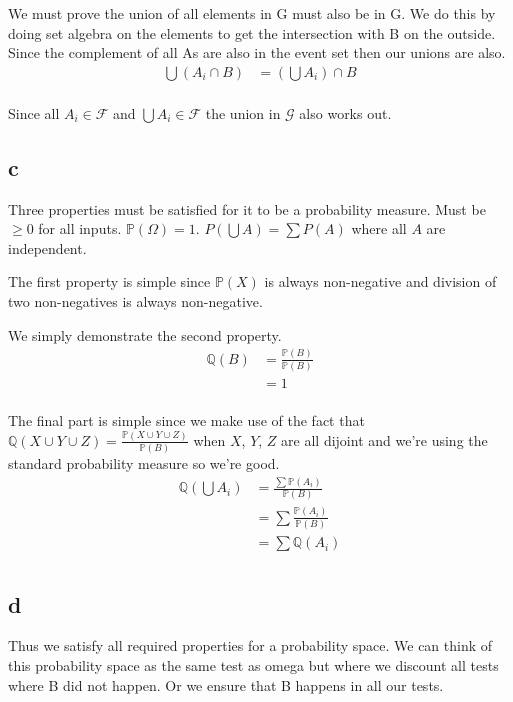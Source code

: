 \documentclass{article}
\newcommand{\prob}{\mathbb{P}}
\begin{document}
We must prove the union of all elements in G must also be in G. We do this
by doing set algebra on the elements to get the intersection with B on the
outside. Since the complement of all As are also in the event set then
our unions are also.
\begin{align*}
    \bigcup (A_i \cap B) &= \left(\bigcup A_i\right) \cap B \\
\end{align*}

Since all $A_i \in \mathcal{F}$ and $\bigcup A_i \in \mathcal{F}$ the union
in $\mathcal{G}$ also works out.

\subsection{c}
Three properties must be satisfied for it to be a probability measure.
Must be $\geq 0$ for all inputs. $\prob(\Omega) = 1$. $P(\bigcup A) = \sum P(A)$
where all $A$ are independent.

The first property is simple since $\prob(X)$ is always non-negative and
division of two non-negatives is always non-negative.

We simply demonstrate the second property.
\begin{align*}
    \mathbb{Q} (B) &= \frac{\prob(B)}{\prob(B)} \\
    &= 1 \\
\end{align*}

The final part is simple since we make use of the fact that
$\mathbb{Q}(X \cup Y \cup Z) = \frac{\prob(X \cup Y \cup Z)}{\prob(B)}$
when $X$, $Y$, $Z$ are all dijoint and we're using the standard
probability measure so we're good.
\begin{align*}
    \mathbb{Q} \left(\bigcup A_i\right) &= \frac{\sum \prob (A_i)}{\prob(B)} \\
    &= \sum \frac{\prob (A_i)}{\prob(B)} \\
    &= \sum \mathbb{Q} (A_i) \\
\end{align*}

\subsection{d}
Thus we satisfy all required properties for a probability space.
We can think of this probability space as the same test as omega but where
we discount all tests where B did not happen. Or we ensure that B happens
in all our tests.
\end{document}
